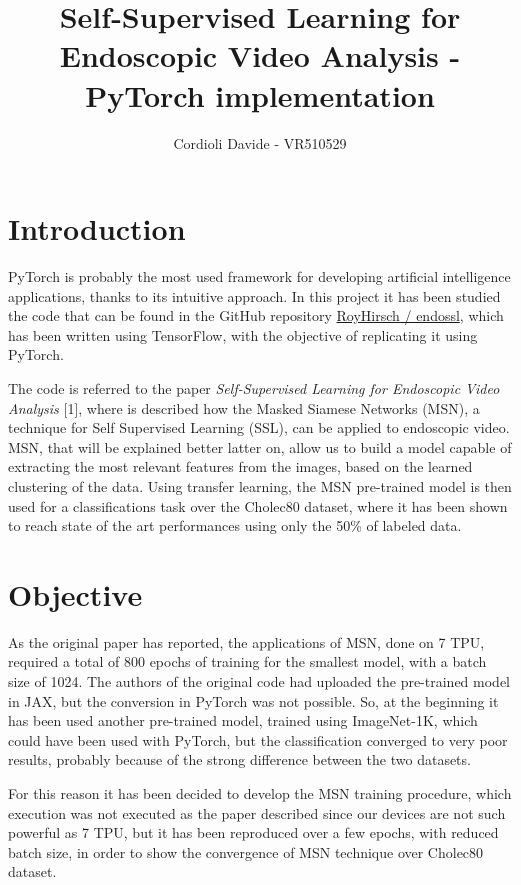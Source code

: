 \documentclass[column]{article}
\title{Self-Supervised Learning for Endoscopic Video Analysis - PyTorch implementation}
\author{Cordioli Davide - VR510529}
\date{}
\begin{document}
	
	\maketitle
	
	\begin{multicols}{2}
		
	\section{Introduction}
	
	PyTorch is probably the most used framework for developing artificial intelligence applications, thanks to its intuitive approach. In this project it has been studied the code that can be found in the GitHub repository  \href{https://github.com/royhirsch/endossl}{RoyHirsch / endossl}, which has been written using TensorFlow, with the objective of replicating it using PyTorch.
	
	The code is referred to the paper \textit{Self-Supervised Learning for Endoscopic Video Analysis} [1], where is described how the Masked Siamese Networks (MSN), a technique for Self Supervised Learning (SSL), can be applied to endoscopic video. MSN, that will be explained better latter on, allow us to build a model capable of extracting the most relevant features from the images, based on the learned clustering of the data. Using transfer learning, the MSN pre-trained model is then used for a classifications task over the Cholec80 dataset, where it has been shown to reach state of the art performances using only the 50\% of labeled data.
	
	\section{Objective}
	
	As the original paper has reported, the applications of MSN, done on 7 TPU, required a total of 800 epochs of training for the smallest model, with a batch size of 1024. The authors of the original code had uploaded the pre-trained model in JAX, but the conversion in PyTorch was not possible. So, at the beginning it has been used another pre-trained model, trained using ImageNet-1K, which could have been used with PyTorch, but the classification converged to very poor results, probably because of the strong difference between the two datasets.
	
	For this reason it has been decided to develop the MSN training procedure, which execution was not executed as the paper described since our devices are not such powerful as 7 TPU, but it has been reproduced over a few epochs, with reduced batch size, in order to show the convergence of MSN technique over Cholec80 dataset.
	

\end{multicols}
\end{document}
